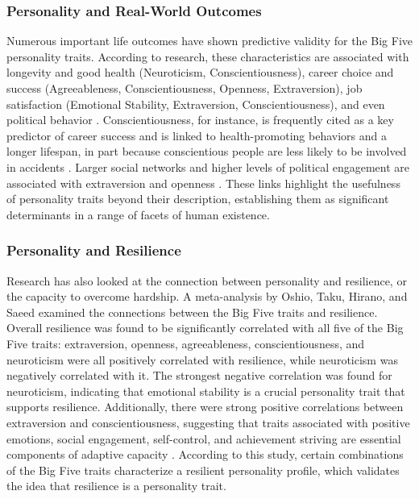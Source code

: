 \documentclass{DESSThesis}
\begin{document}
\subsubsection{Personality and Real-World Outcomes}
Numerous important life outcomes have shown predictive validity for the Big Five personality traits. According to research, these characteristics are associated with longevity and good health (Neuroticism, Conscientiousness), career choice and success (Agreeableness, Conscientiousness, Openness, Extraversion), job satisfaction (Emotional Stability, Extraversion, Conscientiousness), and even political behavior \cite{rammstedt_big_2014,kajonius_assessing_2019}. Conscientiousness, for instance, is frequently cited as a key predictor of career success and is linked to health-promoting behaviors and a longer lifespan, in part because conscientious people are less likely to be involved in accidents \cite{rammstedt_big_2014}. Larger social networks and higher levels of political engagement are associated with extraversion and openness \cite{rammstedt_big_2014}. These links highlight the usefulness of personality traits beyond their description, establishing them as significant determinants in a range of facets of human existence.

\subsubsection{Personality and Resilience}
Research has also looked at the connection between personality and resilience, or the capacity to overcome hardship. A meta-analysis by Oshio, Taku, Hirano, and Saeed examined the connections between the Big Five traits and resilience. Overall resilience was found to be significantly correlated with all five of the Big Five traits: extraversion, openness, agreeableness, conscientiousness, and neuroticism were all positively correlated with resilience, while neuroticism was negatively correlated with it. The strongest negative correlation was found for neuroticism, indicating that emotional stability is a crucial personality trait that supports resilience. Additionally, there were strong positive correlations between extraversion and conscientiousness, suggesting that traits associated with positive emotions, social engagement, self-control, and achievement striving are essential components of adaptive capacity \cite{oshio_resilience_2018}. According to this study, certain combinations of the Big Five traits characterize a resilient personality profile, which validates the idea that resilience is a personality trait.
\end{document}
